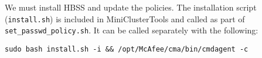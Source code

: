 We must install HBSS and update the policies. The installation script (\texttt{install.sh}) is included in MiniClusterTools and called as part of \texttt{set\_passwd\_policy.sh}. It can be called separately with the following:
 
\begin{verbatim}
sudo bash install.sh -i && /opt/McAfee/cma/bin/cmdagent -c
\end{verbatim}
